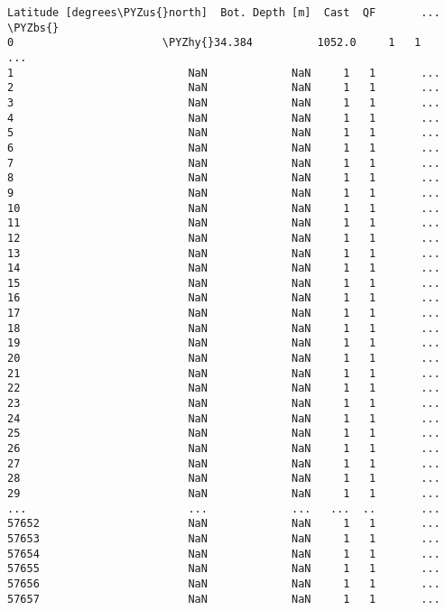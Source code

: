 \documentclass[a4paper,11pt,final]{article}
\def\PYZbs{\char`\\}
\def\PYZus{\char`\_}
\def\PYZhy{\char`\-}
\begin{document}
\begin{Verbatim}[commandchars=\\\{\},frame=leftline,fontsize=\small, xleftmargin=0.5em]
       Latitude [degrees\PYZus{}north]  Bot. Depth [m]  Cast  QF       ...
\PYZbs{}
0                       \PYZhy{}34.384          1052.0     1   1       ...
1                           NaN             NaN     1   1       ...
2                           NaN             NaN     1   1       ...
3                           NaN             NaN     1   1       ...
4                           NaN             NaN     1   1       ...
5                           NaN             NaN     1   1       ...
6                           NaN             NaN     1   1       ...
7                           NaN             NaN     1   1       ...
8                           NaN             NaN     1   1       ...
9                           NaN             NaN     1   1       ...
10                          NaN             NaN     1   1       ...
11                          NaN             NaN     1   1       ...
12                          NaN             NaN     1   1       ...
13                          NaN             NaN     1   1       ...
14                          NaN             NaN     1   1       ...
15                          NaN             NaN     1   1       ...
16                          NaN             NaN     1   1       ...
17                          NaN             NaN     1   1       ...
18                          NaN             NaN     1   1       ...
19                          NaN             NaN     1   1       ...
20                          NaN             NaN     1   1       ...
21                          NaN             NaN     1   1       ...
22                          NaN             NaN     1   1       ...
23                          NaN             NaN     1   1       ...
24                          NaN             NaN     1   1       ...
25                          NaN             NaN     1   1       ...
26                          NaN             NaN     1   1       ...
27                          NaN             NaN     1   1       ...
28                          NaN             NaN     1   1       ...
29                          NaN             NaN     1   1       ...
...                         ...             ...   ...  ..       ...
57652                       NaN             NaN     1   1       ...
57653                       NaN             NaN     1   1       ...
57654                       NaN             NaN     1   1       ...
57655                       NaN             NaN     1   1       ...
57656                       NaN             NaN     1   1       ...
57657                       NaN             NaN     1   1       ...

\end{Verbatim}
\end{document}
